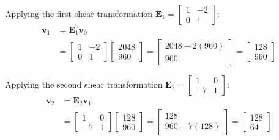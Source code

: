 \begin{enumerate}[label=\thesubsection.\arabic*, ref=\thesubsection.\theenumi]
	Applying the first shear transformation $\mathbf{E}_1 = \begin{bmatrix} 1 & -2 \\ 0 & 1 \end{bmatrix}$:
	\begin{align*}
		\mathbf{v}_1 &= \mathbf{E}_1 \mathbf{v}_0 \\
		&= \begin{bmatrix} 1 & -2 \\ 0 & 1 \end{bmatrix} \begin{bmatrix} 2048 \\ 960 \end{bmatrix} 
		= \begin{bmatrix} 2048 - 2(960) \\ 960 \end{bmatrix} 
		= \begin{bmatrix} 128 \\ 960 \end{bmatrix}
	\end{align*}
	
	Applying the second shear transformation $\mathbf{E}_2 = \begin{bmatrix} 1 & 0 \\ -7 & 1 \end{bmatrix}$:
	\begin{align*}
		\mathbf{v}_2 &= \mathbf{E}_2 \mathbf{v}_1 \\
		&= \begin{bmatrix} 1 & 0 \\ -7 & 1 \end{bmatrix} \begin{bmatrix} 128 \\ 960 \end{bmatrix} 
		= \begin{bmatrix} 128 \\ 960 - 7(128) \end{bmatrix} 
		= \begin{bmatrix} 128 \\ 64 \end{bmatrix}
	\end{align*}
	

\end{enumerate}
